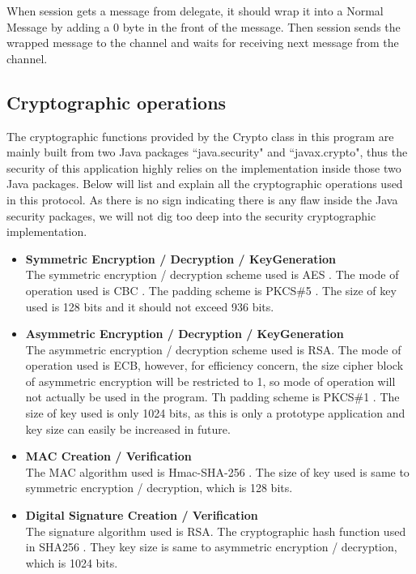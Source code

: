 When session gets a message from delegate, it should wrap it into a Normal Message by adding a 0 byte in the front of the message. Then session sends the wrapped message to the channel and waits for receiving next message from the channel.

\subsection{Cryptographic operations}
The cryptographic functions provided by the Crypto class in this program are mainly built from two Java packages ``java.security" and ``javax.crypto", thus the security of this application highly relies on the implementation inside those two Java packages. Below will list and explain all the cryptographic operations used in this protocol. As there is no sign indicating there is any flaw inside the Java security packages, we will not dig too deep into the security cryptographic implementation. 

\begin{itemize}
\item \textbf{Symmetric Encryption / Decryption / KeyGeneration} \\
The symmetric encryption / decryption scheme used is AES \cite{Miller}. The mode of operation used is CBC \cite{ehrsam1978message}. The padding scheme is PKCS\#5 \cite{RFC2898}. The size of key used is 128 bits and it should not exceed 936 bits.

\item \textbf{Asymmetric Encryption / Decryption / KeyGeneration} \\
The asymmetric encryption / decryption scheme used is RSA. The mode of operation used is ECB, however, for efficiency concern, the size cipher block of asymmetric encryption will be restricted to 1, so mode of operation will not actually be used in the program. Th padding scheme is PKCS\#1 \cite{RFC2313}. The size of key used is only 1024 bits, as this is only a prototype application and key size can easily be increased in future.

\item \textbf{MAC Creation / Verification} \\
The MAC algorithm used is Hmac-SHA-256 \cite{RFC6234}. The size of key used is same to symmetric encryption / decryption, which is 128 bits.

\item \textbf{Digital Signature Creation / Verification} \\
The signature algorithm used is RSA. The cryptographic hash function used in SHA256 \cite{RFC6234}. They key size is same to asymmetric encryption / decryption, which is 1024 bits.
\end{itemize}


